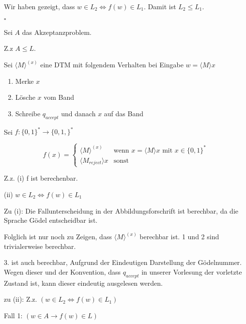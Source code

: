 \documentclass[a4paper,12pt]{article}
\newcommand{\qed}{\hfill$\square$}
\begin{document}
\vspace{1cm}

Wir haben gezeigt, dass $w\in L_2 \iff f(w) \in L_1$. Damit ist $L_2 \leq L_1$.

\qed

\vspace{5cm}

Sei $A$ das Akzeptanzproblem.

Z.z $A \leq L$.

Sei $\langle M\rangle ^{(x)}$ eine DTM mit folgendem Verhalten bei Eingabe $w=\langle M\rangle x$
\begin{enumerate}
  \item Merke $x$
  \item Lösche $x$ vom Band
  \item Schreibe $q_{accept}$ und danach $x$ auf das Band
\end{enumerate}

Sei $f: \{0,1\}^* \rightarrow \{0,1,\}^*$


$$f(x)=\begin{cases}
    \langle M\rangle ^{(x)}     & \text{wenn }x=\langle M\rangle x \text{ mit } x\in\{0,1\}^* \\
    \langle M_{reject}\rangle x & \text{sonst}
  \end{cases}$$

Z.z. (i) f ist berechenbar.

(ii) $w \in L_2 \iff f(w) \in L_1$

Zu (i):
Die Fallunterscheidung in der Abbildungsforschrift ist berechbar, da die Sprache Gödel entscheidbar ist.

Folglich ist nur noch zu Zeigen, dass $\langle M\rangle ^{(x)}$ berechbar ist. 1 und 2 sind trivialerweise berechbar.

3. ist auch berechbar, Aufgrund der Eindeutigen Darstellung der Gödelnummer. Wegen dieser und der Konvention, dass
$q_{accept}$ in unserer Vorlesung der vorletzte Zustand ist, kann dieser eindeutig ausgelesen werden.

\vspace{1cm}

zu (ii): Z.z. $(w \in L_2 \iff f(w) \in L_1)$

Fall 1: $(w \in A \rightarrow f(w) \in L)$
\end{document}
